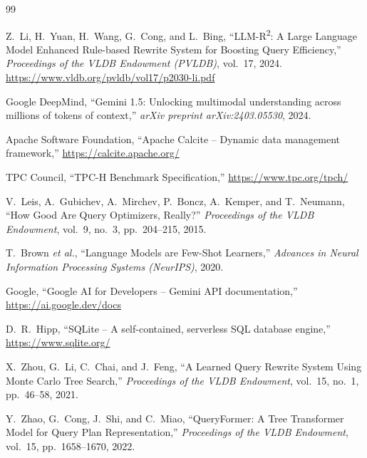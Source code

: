 \documentclass[12pt,a4paper]{article}
\begin{document}
\begin{thebibliography}{99}

Z.~Li, H.~Yuan, H.~Wang, G.~Cong, and L.~Bing,
``LLM-R\textsuperscript{2}: A Large Language Model Enhanced Rule-based Rewrite System for Boosting Query Efficiency,''
\textit{Proceedings of the VLDB Endowment (PVLDB)}, vol.~17, 2024.
\url{https://www.vldb.org/pvldb/vol17/p2030-li.pdf}

Google DeepMind,
``Gemini 1.5: Unlocking multimodal understanding across millions of tokens of context,''
\textit{arXiv preprint arXiv:2403.05530}, 2024.

Apache Software Foundation,
``Apache Calcite -- Dynamic data management framework,''
\url{https://calcite.apache.org/}

TPC Council,
``TPC-H Benchmark Specification,''
\url{https://www.tpc.org/tpch/}

V.~Leis, A.~Gubichev, A.~Mirchev, P.~Boncz, A.~Kemper, and T.~Neumann,
``How Good Are Query Optimizers, Really?''
\textit{Proceedings of the VLDB Endowment}, vol.~9, no.~3, pp.~204--215, 2015.

T.~Brown \textit{et al.},
``Language Models are Few-Shot Learners,''
\textit{Advances in Neural Information Processing Systems (NeurIPS)}, 2020.

Google,
``Google AI for Developers -- Gemini API documentation,''
\url{https://ai.google.dev/docs}

D.~R.~Hipp,
``SQLite -- A self-contained, serverless SQL database engine,''
\url{https://www.sqlite.org/}

X.~Zhou, G.~Li, C.~Chai, and J.~Feng,
``A Learned Query Rewrite System Using Monte Carlo Tree Search,''
\textit{Proceedings of the VLDB Endowment}, vol.~15, no.~1, pp.~46--58, 2021.

Y.~Zhao, G.~Cong, J.~Shi, and C.~Miao,
``QueryFormer: A Tree Transformer Model for Query Plan Representation,''
\textit{Proceedings of the VLDB Endowment}, vol.~15, pp.~1658--1670, 2022.

\end{thebibliography}
\end{document}
